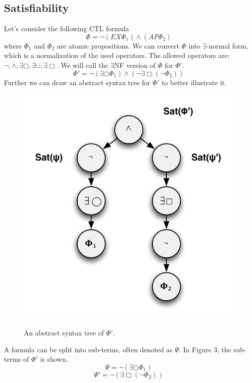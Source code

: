 \documentclass[12pt]{report}
\begin{document}
\subsection*{Satisfiability}
Let's consider the following CTL formula
$$\Phi = \neg(EX \Phi_1) \wedge (AF \Phi_2)$$
where $\Phi_1$ and $\Phi_2$ are atomic propositions. We can convert $\Phi$ into $\exists$-normal form, which is a normalization of the used operators. The allowed operators are: $\neg, \wedge, \exists \bigcirc, \exists \cup, \exists \Box$. We will call the $\exists$NF version of $\Phi$ for $\Phi'$.
$$\Phi' = \neg(\exists \bigcirc \Phi_1) \wedge (\neg\exists \Box (\neg \Phi_2))$$
Further we can draw an abstract syntax tree for $\Phi'$ to better illustrate it.
\begin{figure}[H]
	\centering
	\includegraphics[scale=0.75]{../GFX/Answer-b2-2a.pdf}\\
	\caption{An abstract syntax tree of $\Phi'$.}
\end{figure}
A formula can be split into sub-terms, often denoted as $\Psi$. In Figure 3, the sub-terms of $\Phi'$ is shown.
$$\Psi = \neg(\exists \bigcirc \Phi_1)$$
$$\Psi' = \neg(\exists \Box (\neg \Phi_2))$$
\end{document}
